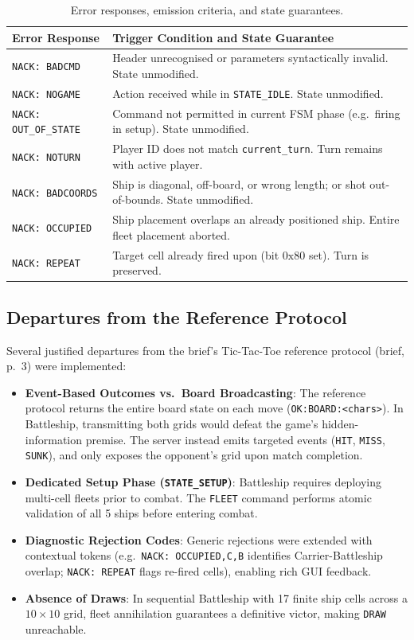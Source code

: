 \begin{table}[t]
\centering
\caption{Error responses, emission criteria, and state guarantees.}
\label{tab:errors}
\footnotesize
\begin{tabular}{@{}L{2.6cm}L{5.4cm}@{}}
\toprule
Error Response & Trigger Condition and State Guarantee \\
\midrule
\texttt{NACK: BADCMD} & Header unrecognised or parameters syntactically invalid. State unmodified. \\
\texttt{NACK: NOGAME} & Action received while in \texttt{STATE\_IDLE}. State unmodified. \\
\texttt{NACK: OUT\_OF\_STATE} & Command not permitted in current FSM phase (e.g.\ firing in setup). State unmodified. \\
\texttt{NACK: NOTURN} & Player ID does not match \texttt{current\_turn}. Turn remains with active player. \\
\texttt{NACK: BADCOORDS} & Ship is diagonal, off-board, or wrong length; or shot out-of-bounds. State unmodified. \\
\texttt{NACK: OCCUPIED} & Ship placement overlaps an already positioned ship. Entire fleet placement aborted. \\
\texttt{NACK: REPEAT} & Target cell already fired upon (bit $0\text{x}80$ set). Turn is preserved. \\
\bottomrule
\end{tabular}
\end{table}

\subsection{Departures from the Reference Protocol}
Several justified departures from the brief's Tic-Tac-Toe reference protocol (brief, p.~3) were implemented:
\begin{itemize}
    \item \textbf{Event-Based Outcomes vs.\ Board Broadcasting}: The reference protocol returns the entire board state on each move (\texttt{OK:BOARD:<chars>}). In Battleship, transmitting both grids would defeat the game's hidden-information premise. The server instead emits targeted events (\texttt{HIT}, \texttt{MISS}, \texttt{SUNK}), and only exposes the opponent's grid upon match completion.
    \item \textbf{Dedicated Setup Phase (\texttt{STATE\_SETUP})}: Battleship requires deploying multi-cell fleets prior to combat. The \texttt{FLEET} command performs atomic validation of all 5 ships before entering combat.
    \item \textbf{Diagnostic Rejection Codes}: Generic rejections were extended with contextual tokens (e.g.\ \texttt{NACK: OCCUPIED,C,B} identifies Carrier-Battleship overlap; \texttt{NACK: REPEAT} flags re-fired cells), enabling rich GUI feedback.
    \item \textbf{Absence of Draws}: In sequential Battleship with 17 finite ship cells across a $10 \times 10$ grid, fleet annihilation guarantees a definitive victor, making \texttt{DRAW} unreachable.
\end{itemize}


